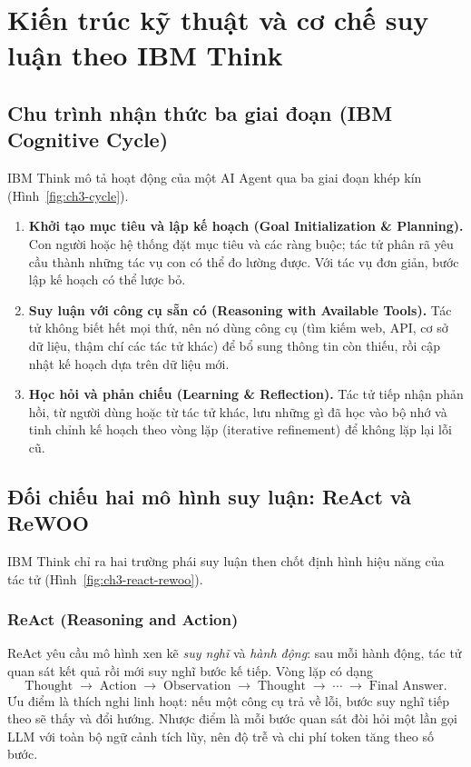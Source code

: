 \chapter{Kiến trúc kỹ thuật và cơ chế suy luận theo IBM Think}

\section{Chu trình nhận thức ba giai đoạn (IBM Cognitive Cycle)}
IBM Think \cite{ibm_agents} mô tả hoạt động của một AI Agent qua ba giai đoạn khép kín (Hình~\ref{fig:ch3-cycle}).
\begin{enumerate}
  \item \textbf{Khởi tạo mục tiêu và lập kế hoạch (Goal Initialization \& Planning).} Con người hoặc hệ thống đặt mục tiêu
        và các ràng buộc; tác tử phân rã yêu cầu thành những tác vụ con có thể đo lường được. Với tác vụ đơn giản, bước lập
        kế hoạch có thể lược bỏ.
  \item \textbf{Suy luận với công cụ sẵn có (Reasoning with Available Tools).} Tác tử không biết hết mọi thứ, nên nó
        dùng công cụ (tìm kiếm web, API, cơ sở dữ liệu, thậm chí các tác tử khác) để bổ sung thông tin còn thiếu, rồi cập
        nhật kế hoạch dựa trên dữ liệu mới.
  \item \textbf{Học hỏi và phản chiếu (Learning \& Reflection).} Tác tử tiếp nhận phản hồi, từ người dùng hoặc từ tác tử
        khác, lưu những gì đã học vào bộ nhớ và tinh chỉnh kế hoạch theo vòng lặp (iterative refinement) để không lặp lại
        lỗi cũ.
\end{enumerate}


\section{Đối chiếu hai mô hình suy luận: ReAct và ReWOO}
IBM Think \cite{ibm_agents} chỉ ra hai trường phái suy luận then chốt định hình hiệu năng của tác tử
(Hình~\ref{fig:ch3-react-rewoo}).

\subsection{ReAct (Reasoning and Action)}
ReAct \cite{yao_react} yêu cầu mô hình xen kẽ \emph{suy nghĩ} và \emph{hành động}: sau mỗi hành động, tác tử quan sát kết
quả rồi mới suy nghĩ bước kế tiếp. Vòng lặp có dạng
\[
  \text{Thought} \;\rightarrow\; \text{Action} \;\rightarrow\; \text{Observation} \;\rightarrow\; \text{Thought}
  \;\rightarrow\; \cdots \;\rightarrow\; \text{Final Answer}.
\]
Ưu điểm là thích nghi linh hoạt: nếu một công cụ trả về lỗi, bước suy nghĩ tiếp theo sẽ thấy và đổi hướng. Nhược điểm là
mỗi bước quan sát đòi hỏi một lần gọi LLM với toàn bộ ngữ cảnh tích lũy, nên độ trễ và chi phí token tăng theo số bước.

